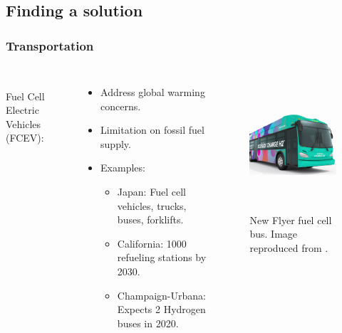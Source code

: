 \subsection{Finding a solution}
\begin{frame}
\frametitle{Transportation}
\begin{columns}
	\\
    Fuel Cell Electric Vehicles (FCEV):
	\begin{itemize}
		\item Address global warming concerns.
		\item Limitation on fossil fuel supply.
		\item Examples:
		\begin{itemize}
			\item Japan: Fuel cell vehicles, trucks, buses, forklifts.
			\item California: 1000 refueling stations by 2030.
			\item Champaign-Urbana: Expects 2 Hydrogen buses in 2020.
		\end{itemize}
	\end{itemize}

	\begin{figure}[htbp!]
		\begin{center}
			\includegraphics[height=5cm]{images/bus.png}
		\end{center}
		\caption{New Flyer fuel cell bus. Image reproduced from \cite{new_flyer_xcelsior_2020}.}
	\end{figure}
\end{columns}
\end{frame}



